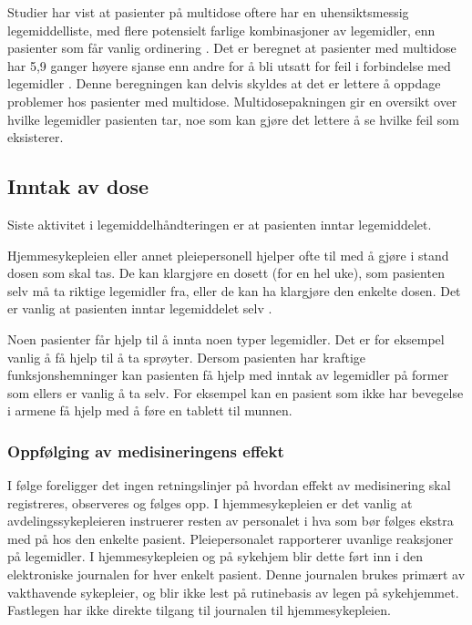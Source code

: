 Studier har vist at pasienter på multidose oftere har en uhensiktsmessig legemiddelliste, med flere potensielt farlige kombinasjoner av legemidler, enn pasienter som får vanlig ordinering \citep{23295105, PDS:PDS2232}. Det er beregnet at pasienter med multidose har 5,9 ganger høyere sjanse enn andre for å bli utsatt for feil i forbindelse med legemidler \citep{multidoseFeil}. Denne beregningen kan delvis skyldes at det er lettere å oppdage problemer hos pasienter med multidose. Multidosepakningen gir en oversikt over hvilke legemidler pasienten tar, noe som kan gjøre det lettere å se hvilke feil som eksisterer.

\subsection{Inntak av dose}
Siste aktivitet i legemiddelhåndteringen er at pasienten inntar legemiddelet.

Hjemmesykepleien eller annet pleiepersonell hjelper ofte til med å gjøre i stand dosen som skal tas. De kan klargjøre en dosett (for en hel uke), som pasienten selv må ta riktige legemidler fra, eller de kan ha klargjøre den enkelte dosen. Det er vanlig at pasienten inntar legemiddelet selv \citep{AutomatiskPilledispenser}.
 
Noen pasienter får hjelp til å innta noen typer legemidler. Det er for eksempel vanlig å få hjelp til å ta sprøyter. Dersom pasienten har kraftige funksjonshemninger kan pasienten få hjelp med inntak av legemidler på former som ellers er vanlig å ta selv. For eksempel kan en pasient som ikke har bevegelse i armene få hjelp med å føre en tablett til munnen. 

\subsubsection{Oppfølging av medisineringens effekt}
I følge \citep{HelsetilsynetRapport} foreligger det ingen retningslinjer på hvordan effekt av medisinering skal registreres, observeres og følges opp. I hjemmesykepleien er det vanlig at avdelingssykepleieren instruerer resten av personalet i hva som bør følges ekstra med på hos den enkelte pasient. Pleiepersonalet rapporterer uvanlige reaksjoner på legemidler. I hjemmesykepleien og på sykehjem blir dette ført inn i den elektroniske journalen for hver enkelt pasient. Denne journalen brukes primært av vakthavende sykepleier, og blir ikke lest på rutinebasis av legen på sykehjemmet. Fastlegen har ikke direkte tilgang til journalen til hjemmesykepleien.

